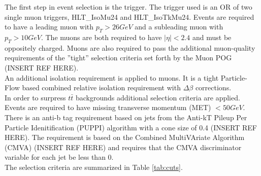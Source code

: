 \documentclass[
10pt, %
a4paper, %
oneside, %
headinclude,footinclude, %
BCOR5mm, %
]{scrartcl}
\begin{document}
The first step in event selection is the trigger. The trigger used is an OR of two single muon triggers, HLT\_IsoMu24 and HLT\_IsoTkMu24. 
Events are required to have a leading muon with $p_T > 26 GeV$ and a subleading muon with $p_T > 10 GeV$. The muons are both required 
to have $|\eta| < 2.4$ and must be oppositely charged. 
Muons are also required to pass the additional muon-quality requirements of the ''tight'' selection 
criteria set forth by the Muon POG (INSERT REF HERE). \\

An additional isolation requirement is applied to muons. It is a tight Particle-Flow based combined relative isolation requirement with $\Delta \beta$ corrections. \\

In order to surpress $t \bar{t}$ backgrounds additional selection criteria are applied. 
Events are required to have missing transverse momentum (MET) $ < 50 GeV$.
There is an anti-b tag requirement based on jets from the Anti-kT 
Pileup Per Particle Idenitification (PUPPI) algorithm with a cone size of 0.4 (INSERT REF HERE). 
The requirement is based on the Combined MultiVAriate Algorithm (CMVA) (INSERT REF HERE) and requires that the CMVA discriminator variable for each jet 
be less than 0. \\

The selection criteria are summarized in Table \ref{tab:cuts}. \\
\end{document}
